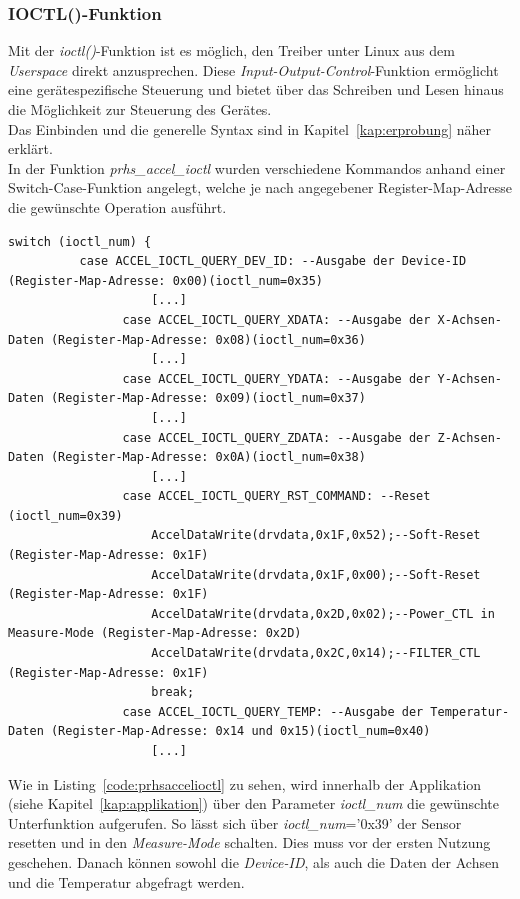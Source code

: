 \subsubsection{IOCTL()-Funktion}\label{kap:ioctl}

Mit der \emph{ioctl()}-Funktion ist es möglich, den Treiber unter Linux aus dem \emph{Userspace} direkt anzusprechen.
Diese \emph{Input-Output-Control}-Funktion ermöglicht eine
gerätespezifische Steuerung und bietet über das Schreiben und Lesen hinaus die Möglichkeit zur Steuerung des
Gerätes.\cite{linuxunix}\\
Das Einbinden und die generelle Syntax sind in Kapitel~\ref{kap:erprobung} näher erklärt.\\

In der Funktion \emph{prhs\_accel\_ioctl} wurden verschiedene Kommandos anhand einer Switch-Case-Funktion angelegt,
welche je nach angegebener Register-Map-Adresse die gewünschte Operation ausführt.\\

\begin{lstlisting}[caption={Switch-Case-Anweisung innerhalb der Funktion \emph{prhs\_accel\_ioctl}},label={code:prhsaccelioctl}]
  switch (ioctl_num) {
          case ACCEL_IOCTL_QUERY_DEV_ID: --Ausgabe der Device-ID (Register-Map-Adresse: 0x00)(ioctl_num=0x35)
  					[...]
  				case ACCEL_IOCTL_QUERY_XDATA: --Ausgabe der X-Achsen-Daten (Register-Map-Adresse: 0x08)(ioctl_num=0x36)
  					[...]
  				case ACCEL_IOCTL_QUERY_YDATA: --Ausgabe der Y-Achsen-Daten (Register-Map-Adresse: 0x09)(ioctl_num=0x37)
  					[...]
  				case ACCEL_IOCTL_QUERY_ZDATA: --Ausgabe der Z-Achsen-Daten (Register-Map-Adresse: 0x0A)(ioctl_num=0x38)
  					[...]
  				case ACCEL_IOCTL_QUERY_RST_COMMAND: --Reset (ioctl_num=0x39)
  					AccelDataWrite(drvdata,0x1F,0x52);--Soft-Reset (Register-Map-Adresse: 0x1F)
  					AccelDataWrite(drvdata,0x1F,0x00);--Soft-Reset (Register-Map-Adresse: 0x1F)
  					AccelDataWrite(drvdata,0x2D,0x02);--Power_CTL in Measure-Mode (Register-Map-Adresse: 0x2D)
  					AccelDataWrite(drvdata,0x2C,0x14);--FILTER_CTL  (Register-Map-Adresse: 0x1F)
  					break;
  				case ACCEL_IOCTL_QUERY_TEMP: --Ausgabe der Temperatur-Daten (Register-Map-Adresse: 0x14 und 0x15)(ioctl_num=0x40)
  					[...]
 \end{lstlisting}

Wie in Listing~\ref{code:prhsaccelioctl} zu sehen, wird innerhalb der Applikation (siehe Kapitel~\ref{kap:applikation})
über den Parameter \emph{ioctl\_num} die gewünschte Unterfunktion aufgerufen. So lässt sich über \emph{ioctl\_num}='0x39'
der Sensor resetten und in den \emph{Measure-Mode} schalten. Dies muss vor der ersten Nutzung geschehen. Danach können
sowohl die \emph{Device-ID}, als auch die Daten der Achsen und die Temperatur abgefragt werden.

